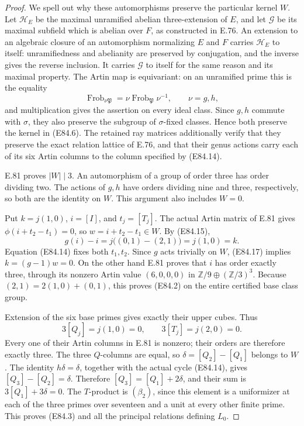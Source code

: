 \begin{proof}
We spell out why these automorphisms preserve the
particular kernel \(W\). Let \(\mathcal H_E\) be the
maximal unramified abelian three-extension of \(E\),
and let \(\mathcal G\) be its maximal subfield which
is abelian over \(F\), as constructed in E.76.
An extension to an algebraic closure of an automorphism
normalizing \(E\) and \(F\) carries
\(\mathcal H_E\) to itself: unramifiedness and
abelianity are preserved by conjugation, and the
inverse gives the reverse inclusion. It carries
\(\mathcal G\) to itself for the same reason and its
maximal property. The Artin map is equivariant:
on an unramified prime this is the equality
\[
 \operatorname{Frob}_{\nu\mathfrak P}
       =\nu\operatorname{Frob}_{\mathfrak P}\nu^{-1},
       \qquad \nu=g,h,
 \tag{E84.16}
\]
and multiplication gives the assertion on every ideal
class. Since \(g,h\) commute with \(\sigma\), they
also preserve the subgroup of \(\sigma\)-fixed
classes. Hence both preserve the kernel in (E84.6).
The retained ray matrices additionally verify that
they preserve the exact relation lattice of E.76,
and that their genus actions carry each of its six
Artin columns to the column specified by (E84.14).

E.81 proves \(|W|\mid3\). An automorphism of a group
of order three has order dividing two. The actions
of \(g,h\) have orders dividing nine and three,
respectively, so both are the identity on \(W\).
This argument also includes \(W=0\).

Put \(k=j(1,0)\), \(i=[I]\), and \(t_j=[T_j]\).
The actual Artin matrix of E.81 gives
\(\phi(i+t_2-t_1)=0\), so \(w=i+t_2-t_1\in W\).
By (E84.15),
\[
 g(i)-i=j\bigl((0,1)-(2,1)\bigr)=j(1,0)=k.
 \tag{E84.17}
\]
Equation (E84.14) fixes both \(t_1,t_2\). Since \(g\)
acts trivially on \(W\), (E84.17) implies
\(k=(g-1)w=0\).
On the other hand E.81 proves that \(i\) has order
exactly three, through its nonzero Artin value
\((6,0,0,0)\) in \(\mathbb Z/9\oplus(\mathbb Z/3)^3\).
Because \((2,1)=2(1,0)+(0,1)\), this proves
(E84.2) on the entire certified base class group.

Extension of the six base primes gives exactly
their upper cubes. Thus
\[
 3[Q_j]=j(1,0)=0,\qquad
 3[T_j]=j(2,0)=0.
 \tag{E84.18}
\]
Every one of their Artin columns in E.81 is nonzero;
their orders are therefore exactly three.
The three \(Q\)-columns are equal, so
\(\delta=[Q_2]-[Q_1]\) belongs to \(W\).
The identity \(h\delta=\delta\), together with the
actual cycle (E84.14), gives
\([Q_3]-[Q_2]=\delta\). Therefore
\([Q_3]=[Q_1]+2\delta\), and their sum is
\(3[Q_1]+3\delta=0\). The \(T\)-product is
\((\beta_2)\), since this element is a uniformizer
at each of the three primes over seventeen and a
unit at every other finite prime. This proves
(E84.3) and all the principal relations defining
\(L_0\).


\end{proof}
